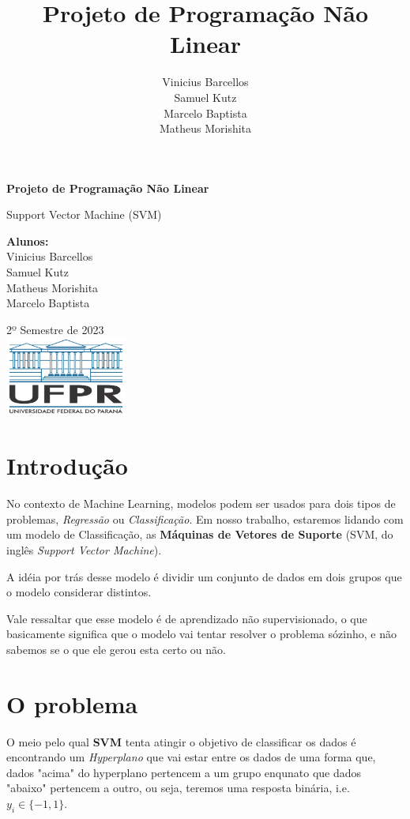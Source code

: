 \documentclass{article}
\title{Projeto de Programação Não Linear}
\author{Vinicius Barcellos\\Samuel Kutz \\Marcelo Baptista \\Matheus Morishita}
\date{}
\begin{document}
\begin{titlepage}
    \begin{center}
        \vspace*{1cm}
            
        \Huge
        \textbf{Projeto de Programação Não Linear}
            
        \vspace{0.5cm}
        \LARGE
        Support Vector Machine (SVM)
            
        \vspace{0.8cm}
        \textbf{Alunos:}\\
        Vinicius Barcellos\\Samuel Kutz\\Matheus Morishita\\Marcelo Baptista
            
        \vfill
        2º Semestre de 2023\\ 
        \vfill
        \includegraphics[width=0.3\textwidth]{ufpr_1000.jpg}
            
            
    \end{center}
\end{titlepage}

\section{Introdução}
No contexto de Machine Learning, modelos podem ser usados para dois tipos de problemas, \textit{Regressão} ou \textit{Classificação}. Em nosso trabalho, estaremos lidando com um modelo de Classificação, as \textbf{Máquinas de Vetores de Suporte} (SVM, do inglês \textit{Support Vector Machine}).

A idéia por trás desse modelo é dividir um conjunto de dados em dois grupos que o modelo considerar distintos. 

Vale ressaltar que esse modelo é de aprendizado não supervisionado, o que basicamente significa que o modelo vai tentar resolver o problema sózinho, e não sabemos se o que ele gerou esta certo ou não.


\section{O problema}
O meio pelo qual \textbf{SVM} tenta atingir o objetivo de classificar os dados é encontrando um \textit{Hyperplano} que vai estar entre os dados de uma forma que, dados "acima" do hyperplano pertencem a um grupo enqunato que dados "abaixo" pertencem a outro, ou seja, teremos uma resposta binária, i.e. \(y_i\in\{-1,1\}\).
\end{document}
